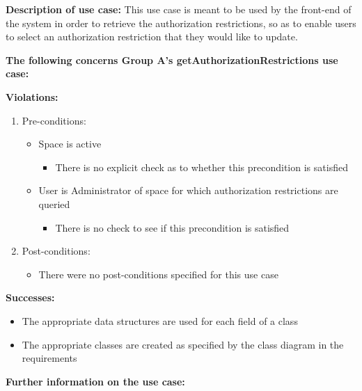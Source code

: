 \textbf{Description of use case:}\newline
This use case is meant to be used by the front-end of the system in order to retrieve the authorization restrictions, so as to enable users to select an authorization restriction that they would like to update.


\noindent
\medskip

\textbf{The following concerns Group A's getAuthorizationRestrictions use case:}\newline


\textbf{Violations:}
\begin{enumerate}
	\item Pre-conditions:	
	\begin{itemize}
		\item Space is active
		\begin{itemize}
				\item There is no explicit check as to whether this precondition is satisfied
		\end{itemize}
		\item User is Administrator of space for which authorization restrictions are queried
		\begin{itemize}
				\item There is no check to see if this precondition is satisfied
		\end{itemize}
	\end{itemize}
	
	\item Post-conditions:
	\begin{itemize}
		\item There were no post-conditions specified for this use case
	\end{itemize}
		
\end{enumerate}

\textbf{Successes:}
\begin{itemize}
	\item The appropriate data structures are used for each field of a class
	\item The appropriate classes are created as specified by the class diagram in the requirements
\end{itemize}


\noindent
\medskip

\textbf{Further information on the use case:}
\noindent

